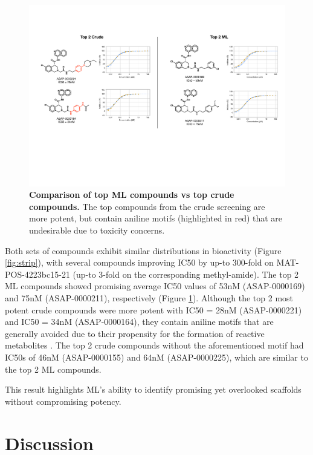 \begin{figure}[!t]
    \centering
    \includegraphics[width=\textwidth]{Chapters/Crude/Figs/ml_vs_crude.pdf}
    \caption{\textbf{Comparison of top ML compounds vs top crude compounds.} The top compounds from the crude screening are more potent, but contain aniline motifs (highlighted in red) that are undesirable due to toxicity concerns.}
    \label{fig:ml_vs_crude}
\end{figure}

Both sets of compounds exhibit similar distributions in bioactivity (Figure \ref{fig:strip}), with several compounds improving IC50 by up-to 300-fold on MAT-POS-4223bc15-21 (up-to 3-fold on the corresponding methyl-amide). The top 2 ML compounds showed promising average IC50 values of 53nM (ASAP-0000169) and 75nM (ASAP-0000211), respectively (Figure \ref{fig:ml_vs_crude}). Although the top 2 most potent crude compounds were  more potent with IC50 = 28nM (ASAP-0000221) and IC50 = 34nM (ASAP-0000164), they contain aniline motifs that are generally avoided due to their propensity for the formation of reactive metabolites \cite{Stepan2011aniline}. The top 2 crude compounds without the aforementioned motif had IC50s of 46nM (ASAP-0000155) and 64nM (ASAP-0000225), which are similar to the top 2 ML compounds.

This result highlights ML's ability to identify promising yet overlooked scaffolds without compromising potency. 

\section{Discussion}

